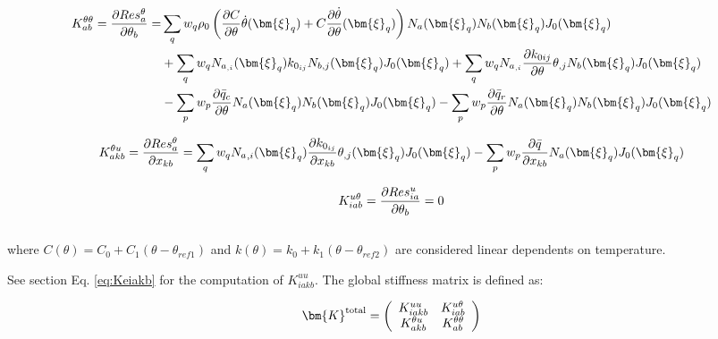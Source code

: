 \documentclass[oneside,11pt,times]{book}
\begin{document}
\begin{equation}
\begin{aligned}
\centering
K_{ab}^{\theta\theta} =  \dfrac{\partial{Res^{\theta}_{a}}}{\partial{\theta_b}} =& \sum_q w_q\rho_0\left(\dfrac{\partial C}{\partial\theta}\dot{\theta}(\bm{\xi}_q)+C\dfrac{\partial \dot{\theta}}{\partial\theta}(\bm{\xi}_q)\right) N_a(\bm{\xi}_q)N_b(\bm{\xi}_q)J_0(\bm{\xi}_q)\\&+\sum_q w_q N_{a_{,i}}(\bm{\xi}_q)k_{0_{ij}}N_{b,j}(\bm{\xi}_q)J_0(\bm{\xi}_q)
+\sum_q w_q N_{a_{,i}}\dfrac{\partial k_{0ij}}{\partial\theta}\theta_{,j}N_b(\bm{\xi}_q)J_0(\bm{\xi}_q)
\\
&-\sum_p w_p\dfrac{\partial{\bar{q}}_c}{\partial\theta} N_a(\bm{\xi}_q)N_b(\bm{\xi}_q)J_0(\bm{\xi}_q) -\sum_p w_p\dfrac{\partial{\bar{q}}_{r}}{\partial\theta} N_a(\bm{\xi}_q)N_b(\bm{\xi}_q)J_0(\bm{\xi}_q)
\end{aligned}
\label{equationKThetaTheta}
\end{equation}

\begin{equation}
\begin{aligned}
\centering
K_{akb}^{\theta u}=\dfrac{\partial{Res^{\theta}_{a}}}{\partial{x_{kb}}}=\sum_q w_q {N_a}_{,i}(\bm{\xi}_q)\frac{\partial k_{0_{ij}}}{\partial x_{kb}}\theta_{,j}(\bm{\xi}_q)J_0(\bm{\xi}_q)-\sum_p w_p\frac{\partial\bar{q}}{\partial x_{kb}} N_a(\bm{\xi}_q)J_0(\bm{\xi}_q)
\end{aligned}
\label{equationKThetau}
\end{equation}

\begin{equation}
\begin{aligned}
\centering
K_{iab}^{u\theta}=\dfrac{\partial{Res^{u}_{ia}}}{\partial{\theta_{b}}}=0
\end{aligned}
\label{equationKuTheta}
\end{equation}
\\
where $C(\theta)=C_0+C_1 (\theta-\theta_{ref1})$ and $k(\theta)=k_0+k_1(\theta-\theta_{ref2})$ are considered linear dependents on temperature.

See section Eq. \ref{eq:Keiakb} for the computation of $K_{iakb}^{u u}$. The global stiffness matrix is defined as:

\begin{equation}
\begin{aligned}
\centering
\bm{K}^{\text{total}}=\left( \begin{array}{cc} K_{iakb}^{u u} & K_{iab}^{u\theta} \\
K_{akb}^{\theta u} & K_{ab}^{\theta \theta} \end{array} \right)
\end{aligned}
\label{equationKtotalThetaMecha}
\end{equation}
\\
\end{document}
